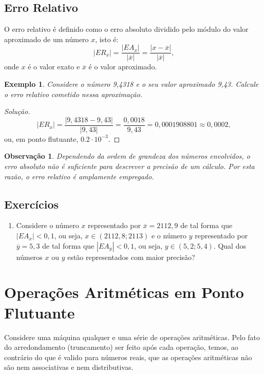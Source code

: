 \documentclass[
	12pt,				%
	openright,			%
	twoside,			%
	a4paper,			%
	english,			%
	french,				%
	brazil,				%
	sumario=tradicional
]{abntex2}
\newtheorem{example}{Exemplo}
\newtheorem{remark}{Observação}
\newenvironment{solution}{
	\begin{proof}[Solução]
}{\end{proof}}
\numberwithin{example}{chapter}
\numberwithin{remark}{chapter}
\numberwithin{definition}{chapter}
\numberwithin{figure}{chapter}
\begin{document}
\subsection{Erro Relativo}

O erro relativo é definido como o erro absoluto dividido pelo módulo do valor aproximado de um número $x$, isto é:
$$
    |ER_x|
    =\frac{|EA_x|}{|\overline{x}|}
    =\frac{|x-\overline{x}|}{|\overline{x}|}
    \text{,}
$$
onde $x$ é o valor exato e $\overline{x}$ é o valor aproximado.

\begin{example}
    Considere o número 9,4318 e o seu valor aproximado 9,43. Calcule o erro relativo cometido nessa aproximação.
\end{example}
\begin{solution}
    $$
        |ER_x|
        =\frac{|9,4318-9,43|}{|9,43|}
        =\frac{0,0018}{9,43}
        =0,0001908801
        \approx 0,0002
        \text{,}
    $$
    ou, em ponto flutuante, $0.2\cdot 10^{-3}$.
\end{solution}

\begin{remark}
    Dependendo da ordem de grandeza dos números envolvidos, o erro absoluto não é suficiente para descrever a precisão de um cálculo. Por esta razão, o erro relativo é amplamente empregado.
\end{remark}

\subsection{Exercícios}

\begin{enumerate}
    \item Considere o número $x$ representado por $\overline{x}=2112,9$ de tal forma que $|EA_x|<0,1$, ou seja, $x \in (2112,8; 2113)$ e o número $y$ representado por $\overline{y}=5,3$ de tal forma que $|EA_y|<0,1$, ou seja, $y\in (5,2; 5,4)$. Qual dos números $x$ ou $y$ estão representados com maior precisão?
\end{enumerate}

\section{Operações Aritméticas em Ponto Flutuante}

Considere uma máquina qualquer e uma série de operações aritméticas. Pelo fato do arredondamento (truncamento) ser feito após cada operação, temos, ao contrário do que é valido para números reais, que as operações aritméticas não são nem associativas e nem distributivas.
\end{document}

